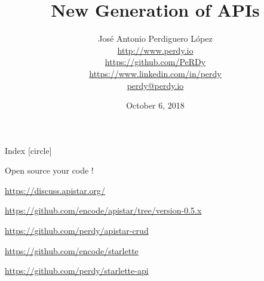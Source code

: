 \documentclass[final, 9pt, svgnames]{beamerPerdy}
\title{New Generation of APIs}
\author[J. A. Perdiguero López]{
José Antonio Perdiguero López\\
\href{http://www.perdy.io}{\scriptsize{\faGlobe\; http://www.perdy.io}}\\
\href{https://github.com/PeRDy}{\scriptsize{\faGithub\; https://github.com/PeRDy}}\\
\href{https://www.linkedin.com/in/perdy}{\scriptsize{\faLinkedin\; https://www.linkedin.com/in/perdy}}\\
\href{mailto://perdy@perdy.io}{\scriptsize{\faAt\; perdy@perdy.io}}}
\institute[Whalar]{Head of Data Science @ Whalar}
\date{October 6, 2018}
\begin{document}
\begin{frame}
    \titlepage
\end{frame}

\begin{frame}{Index}
    [circle]
    \tableofcontents
\end{frame}








\begin{frame}[standout]
    \Huge{Open source your code !}

    \Huge{\faLinux}

    \href{https://discuss.apistar.org/}{\scriptsize{https://discuss.apistar.org/}}

    \href{https://github.com/encode/apistar/tree/version-0.5.x}{\scriptsize{https://github.com/encode/apistar/tree/version-0.5.x}}

    \href{https://github.com/perdy/apistar-crud}{\scriptsize{https://github.com/perdy/apistar-crud}}

    \href{https://github.com/encode/starlette}{\scriptsize{https://github.com/encode/starlette}}

    \href{https://github.com/perdy/starlette-api}{\scriptsize{https://github.com/perdy/starlette-api}}
\end{frame}
\end{document}
